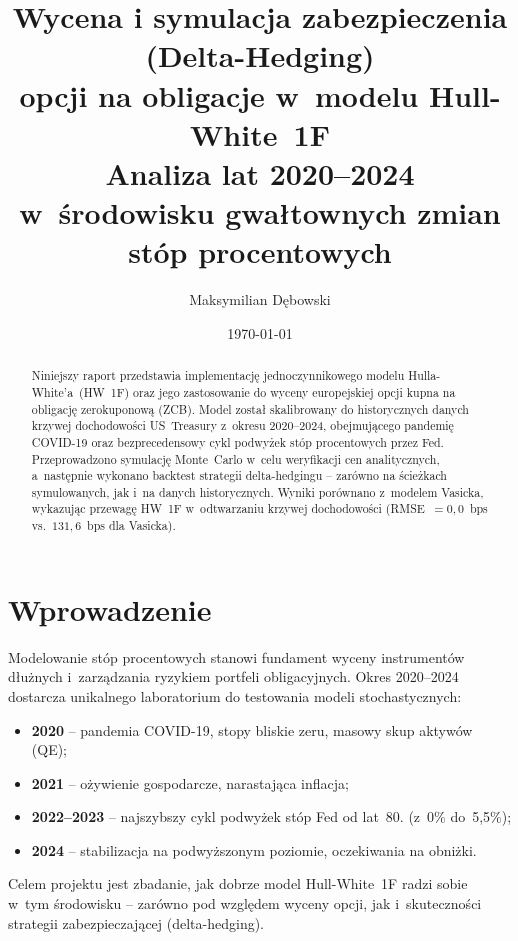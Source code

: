 \documentclass[12pt,a4paper]{article}
\title{%
  \textbf{Wycena i symulacja zabezpieczenia (Delta-Hedging)\\
  opcji na obligacje w~modelu Hull-White~1F}\\[0.5em]
  \large Analiza lat 2020--2024 w~środowisku gwałtownych zmian\\
  stóp procentowych
}
\author{Maksymilian Dębowski}
\date{\today}
\begin{document}
\maketitle
\thispagestyle{empty}

\begin{abstract}
Niniejszy raport przedstawia implementację jednoczynnikowego modelu
Hulla-White'a~(HW~1F) oraz jego zastosowanie do wyceny europejskiej opcji
kupna na obligację zerokuponową (ZCB). Model został skalibrowany do
historycznych danych krzywej dochodowości US~Treasury z~okresu 2020--2024,
obejmującego pandemię COVID-19 oraz bezprecedensowy cykl podwyżek stóp
procentowych przez Fed. Przeprowadzono symulację Monte~Carlo w~celu
weryfikacji cen analitycznych, a~następnie wykonano backtest strategii
delta-hedgingu -- zarówno na ścieżkach symulowanych, jak i~na danych
historycznych. Wyniki porównano z~modelem Vasicka, wykazując przewagę HW~1F
w~odtwarzaniu krzywej dochodowości (RMSE~$= 0{,}0$~bps vs.~$131{,}6$~bps
dla Vasicka).
\end{abstract}

\tableofcontents
\newpage

\section{Wprowadzenie}
\label{sec:intro}

Modelowanie stóp procentowych stanowi fundament wyceny instrumentów dłużnych
i~zarządzania ryzykiem portfeli obligacyjnych. Okres 2020--2024 dostarcza
unikalnego laboratorium do testowania modeli stochastycznych:

\begin{itemize}
  \item \textbf{2020} -- pandemia COVID-19, stopy bliskie zeru, masowy skup
        aktywów (QE);
  \item \textbf{2021} -- ożywienie gospodarcze, narastająca inflacja;
  \item \textbf{2022--2023} -- najszybszy cykl podwyżek stóp Fed od lat~80.
        (z~0\% do~5,5\%);
  \item \textbf{2024} -- stabilizacja na podwyższonym poziomie, oczekiwania
        na obniżki.
\end{itemize}

Celem projektu jest zbadanie, jak dobrze model Hull-White~1F radzi sobie
w~tym środowisku -- zarówno pod względem wyceny opcji, jak i~skuteczności
strategii zabezpieczającej (delta-hedging).
\end{document}
